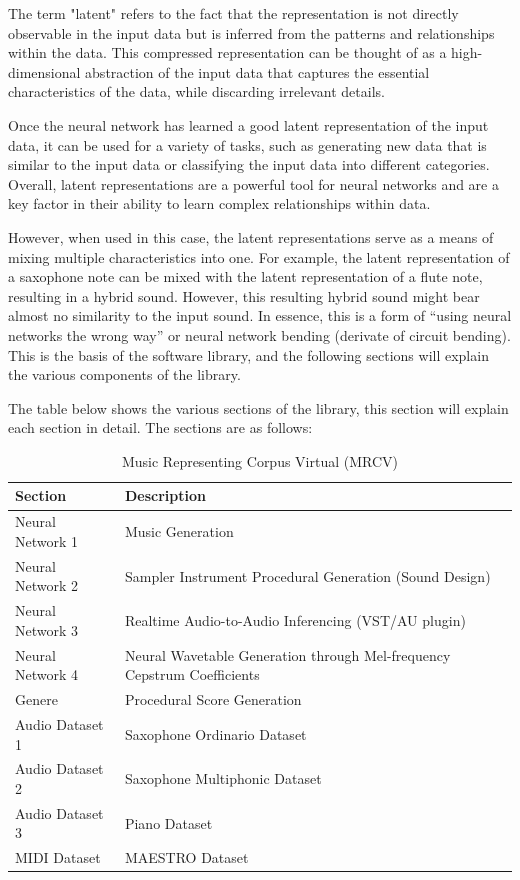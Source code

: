 \documentclass{article}
\begin{document}
The term "latent" refers to the fact that the representation is not directly observable in the input data but is inferred from the patterns and relationships within the data. This compressed representation can be thought of as a high-dimensional abstraction of the input data that captures the essential characteristics of the data, while discarding irrelevant details.

Once the neural network has learned a good latent representation of the input data, it can be used for a variety of tasks, such as generating new data that is similar to the input data or classifying the input data into different categories. Overall, latent representations are a powerful tool for neural networks and are a key factor in their ability to learn complex relationships within data.

However, when used in this case, the latent representations serve as a means of mixing multiple characteristics into one. For example, the latent representation of a saxophone note can be mixed with the latent representation of a flute note, resulting in a hybrid sound. However, this resulting hybrid sound might bear almost no similarity to the input sound. In essence, this is a form of ``using neural networks the wrong way'' or neural network bending (derivate of circuit bending). This is the basis of the software library, and the following sections will explain the various components of the library.

The table below shows the various sections of the library, this section will explain each section in detail. The sections are as follows:
\begin{table}[h]
	\centering
	\caption{Music Representing Corpus Virtual (MRCV)}
	\label{tab:sections}
	\begin{tabular}{ll}
		\toprule
		Section          & Description                                                             \\
		\midrule
		Neural Network 1 & Music Generation                                                        \\
		Neural Network 2 & Sampler Instrument Procedural Generation (Sound Design)                 \\
		Neural Network 3 & Realtime Audio-to-Audio Inferencing (VST/AU plugin)                     \\
		Neural Network 4 & Neural Wavetable Generation through Mel-frequency Cepstrum Coefficients \\
		Genere           & Procedural Score Generation                                             \\
		Audio Dataset 1  & Saxophone Ordinario Dataset                                             \\
		Audio Dataset 2  & Saxophone Multiphonic Dataset                                           \\
		Audio Dataset 3  & Piano Dataset                                                           \\
		MIDI Dataset     & MAESTRO Dataset                                                         \\
		\bottomrule
	\end{tabular}
\end{table}
\end{document}
